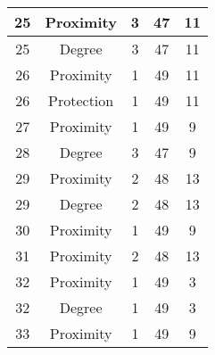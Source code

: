 \documentclass[results.tex]{subfiles}
\begin{document}
\begin{center}
\begin{tabular}{| c || c | c | c | c |}
            \hline
            25                      & Proximity                    & 3                      & 47                      & 11                   \\
            \hline
            25                      & Degree                       & 3                      & 47                      & 11                   \\
            \hline
            26                      & Proximity                    & 1                      & 49                      & 11                   \\
            \hline
            26                      & Protection                   & 1                      & 49                      & 11                   \\
            \hline
            27                      & Proximity                    & 1                      & 49                      & 9                    \\
            \hline
            28                      & Degree                       & 3                      & 47                      & 9                    \\
            \hline
            29                      & Proximity                    & 2                      & 48                      & 13                   \\
            \hline
            29                      & Degree                       & 2                      & 48                      & 13                   \\
            \hline
            30                      & Proximity                    & 1                      & 49                      & 9                    \\
            \hline
            31                      & Proximity                    & 2                      & 48                      & 13                   \\
            \hline
            32                      & Proximity                    & 1                      & 49                      & 3                    \\
            \hline
            32                      & Degree                       & 1                      & 49                      & 3                    \\
            \hline
            33                      & Proximity                    & 1                      & 49                      & 9                    \\

\end{tabular}
\end{center}
\end{document}

